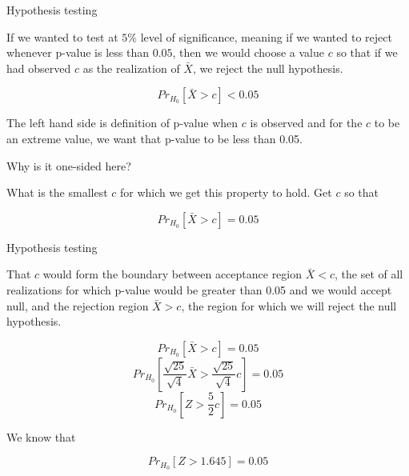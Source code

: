 \documentclass{beamer}\usepackage[]{graphicx}\usepackage[]{color}
\begin{document}
\begin{frame}{Hypothesis testing}

If we wanted to test at $5\%$ level of significance, meaning if we wanted to reject whenever p-value is less than $0.05$, then we would choose a value $c$ so that if 
we had observed $c$ as the realization of $\bar{X}$, we reject the null hypothesis.

$$ Pr_{H_0} \left [ \bar{X} > c \right ] < 0.05 $$ \pause

The left hand side is definition of p-value when $c$ is observed and for the $c$ to be an extreme value, we want that p-value to be less than 0.05. \pause \newline

Why is it one-sided here? \pause \newline

What is the smallest $c$ for which we get this property to hold. Get $c$ so that 


$$ Pr_{H_0} \left [ \bar{X} > c \right ] = 0.05 $$ \pause

\end{frame}

\begin{frame}{Hypothesis testing}

That $c$ would form the boundary between acceptance region $\bar{X} < c$, the set of all realizations for which p-value would be greater than 0.05 and we would accept null,
and the rejection region $\bar{X}> c$, the region for which we will reject the null hypothesis. \pause \newline

$$ Pr_{H_0} \left [ \bar{X} > c \right ] = 0.05 $$
$$ Pr_{H_0} \left [ \frac{\sqrt{25}}{\sqrt{4}} \bar{X} > \frac{\sqrt{25}}{\sqrt{4}} c \right ]=0.05 $$
$$ Pr_{H_0} \left [ Z > \frac{5}{2} c \right ]=0.05 $$ \pause


We know that 

$$ Pr_{H_0} \left [ Z > 1.645 \right ]=0.05 $$ \pause

\end{frame}
\end{document}
